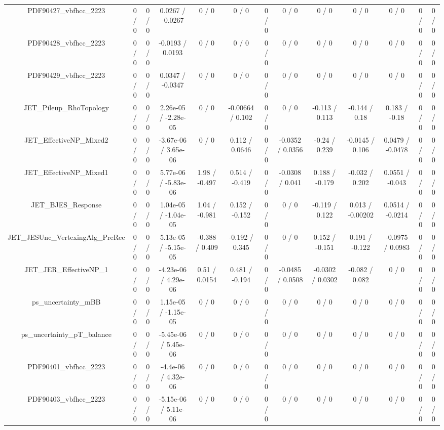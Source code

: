 \documentclass[10pt]{article}
\begin{document}
\begin{table}[htbp]
\begin{center}
\begin{tabular}{|c|c|c|c|c|c|c|c|c|c|c|c|c|}
  PDF90427_vbfhcc_2223 & 0 / 0 & 0 / 0 & 0.0267 / -0.0267 & 0 / 0 & 0 / 0 & 0 / 0 & 0 / 0 & 0 / 0 & 0 / 0 & 0 / 0 & 0 / 0 & 0 / 0 \\ 
  PDF90428_vbfhcc_2223 & 0 / 0 & 0 / 0 & -0.0193 / 0.0193 & 0 / 0 & 0 / 0 & 0 / 0 & 0 / 0 & 0 / 0 & 0 / 0 & 0 / 0 & 0 / 0 & 0 / 0 \\ 
  PDF90429_vbfhcc_2223 & 0 / 0 & 0 / 0 & 0.0347 / -0.0347 & 0 / 0 & 0 / 0 & 0 / 0 & 0 / 0 & 0 / 0 & 0 / 0 & 0 / 0 & 0 / 0 & 0 / 0 \\ 
  JET_Pileup_RhoTopology & 0 / 0 & 0 / 0 & 2.26e-05 / -2.28e-05 & 0 / 0 & -0.00664 / 0.102 & 0 / 0 & 0 / 0 & -0.113 / 0.113 & -0.144 / 0.18 & 0.183 / -0.18 & 0 / 0 & 0 / 0 \\ 
  JET_EffectiveNP_Mixed2 & 0 / 0 & 0 / 0 & -3.67e-06 / 3.65e-06 & 0 / 0 & 0.112 / 0.0646 & 0 / 0 & -0.0352 / 0.0356 & -0.24 / 0.239 & -0.0145 / 0.106 & 0.0479 / -0.0478 & 0 / 0 & 0 / 0 \\ 
  JET_EffectiveNP_Mixed1 & 0 / 0 & 0 / 0 & 5.77e-06 / -5.83e-06 & 1.98 / -0.497 & 0.514 / -0.419 & 0 / 0 & -0.0308 / 0.041 & 0.188 / -0.179 & -0.032 / 0.202 & 0.0551 / -0.043 & 0 / 0 & 0 / 0 \\ 
  JET_BJES_Response & 0 / 0 & 0 / 0 & 1.04e-05 / -1.04e-05 & 1.04 / -0.981 & 0.152 / -0.152 & 0 / 0 & 0 / 0 & -0.119 / 0.122 & 0.013 / -0.00202 & 0.0514 / -0.0214 & 0 / 0 & 0 / 0 \\ 
  JET_JESUnc_VertexingAlg_PreRec & 0 / 0 & 0 / 0 & 5.13e-05 / -5.15e-05 & -0.388 / 0.409 & -0.192 / 0.345 & 0 / 0 & 0 / 0 & 0.152 / -0.151 & 0.191 / -0.122 & -0.0975 / 0.0983 & 0 / 0 & 0 / 0 \\ 
  JET_JER_EffectiveNP_1 & 0 / 0 & 0 / 0 & -4.23e-06 / 4.29e-06 & 0.51 / 0.0154 & 0.481 / -0.194 & 0 / 0 & -0.0485 / 0.0508 & -0.0302 / 0.0302 & -0.082 / 0.082 & 0 / 0 & 0 / 0 & 0 / 0 \\ 
  ps_uncertainty_mBB & 0 / 0 & 0 / 0 & 1.15e-05 / -1.15e-05 & 0 / 0 & 0 / 0 & 0 / 0 & 0 / 0 & 0 / 0 & 0 / 0 & 0 / 0 & 0 / 0 & 0 / 0 \\ 
  ps_uncertainty_pT_balance & 0 / 0 & 0 / 0 & -5.45e-06 / 5.45e-06 & 0 / 0 & 0 / 0 & 0 / 0 & 0 / 0 & 0 / 0 & 0 / 0 & 0 / 0 & 0 / 0 & 0 / 0 \\ 
  PDF90401_vbfhcc_2223 & 0 / 0 & 0 / 0 & -4.4e-06 / 4.32e-06 & 0 / 0 & 0 / 0 & 0 / 0 & 0 / 0 & 0 / 0 & 0 / 0 & 0 / 0 & 0 / 0 & 0 / 0 \\ 
  PDF90403_vbfhcc_2223 & 0 / 0 & 0 / 0 & -5.15e-06 / 5.11e-06 & 0 / 0 & 0 / 0 & 0 / 0 & 0 / 0 & 0 / 0 & 0 / 0 & 0 / 0 & 0 / 0 & 0 / 0 \\ 

\end{tabular}
\end{center}
\end{table}
\end{document}
